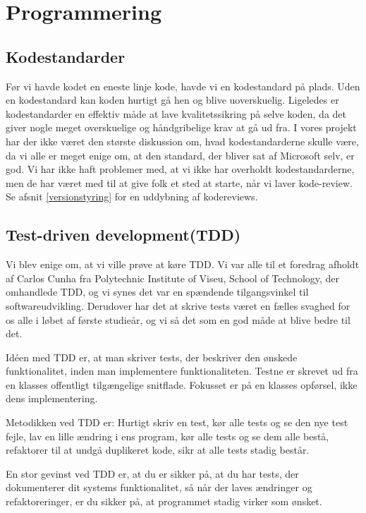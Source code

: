 \section{Programmering}
\label{kabitel:Programmering}
\subsection{Kodestandarder}
\label{Kodestandarder}

Før vi havde kodet en eneste linje kode, havde vi en kodestandard på plads.
Uden en kodestandard kan koden hurtigt gå hen og blive uoverskuelig.
Ligeledes er kodestandarder en effektiv måde at lave kvalitetssikring på selve koden, da det giver nogle meget overskuelige og håndgribelige krav at gå ud fra.
I vores projekt har der ikke været den største diskussion om, hvad kodestandarderne skulle være, da vi alle er meget enige om, at den standard, der bliver sat af Microsoft selv, er god\cite{microsoftcsharp}. 
Vi har ikke haft problemer med, at vi ikke har overholdt kodestandarderne, men de har været med til at give folk et sted at starte, når vi laver kode-review. Se afsnit \ref{versionstyring} for en uddybning af kodereviews.

\subsection{Test-driven development(TDD)}
\label{TDD}

Vi blev enige om, at vi ville prøve at køre TDD.
Vi var alle til et foredrag afholdt af Carlos Cunha fra Polytechnic Institute of Viseu, School of Technology, der omhandlede TDD, og vi synes det var en spændende tilgangsvinkel til softwareudvikling.
Derudover har det at skrive tests været en fælles svaghed for os alle i løbet af første studieår, og vi så det som en god måde at blive bedre til det.

Idéen med TDD er, at man skriver tests, der beskriver den ønskede funktionalitet, inden man implementere funktionaliteten.
Testne er skrevet ud fra en klasses offentligt tilgængelige snitflade.
Fokusset er på en klasses opførsel, ikke dens implementering.

Metodikken ved TDD er:
Hurtigt skriv en test, kør alle tests og se den nye test fejle, lav en lille ændring i ens program, kør alle tests og se dem alle bestå, refaktorer til at undgå duplikeret kode, sikr at alle tests stadig består.

En stor gevinst ved TDD er, at du er sikker på, at du har tests, der dokumenterer dit systems funktionalitet, så når der laves ændringer og refaktoreringer, er du sikker på, at programmet stadig virker som ønsket.


